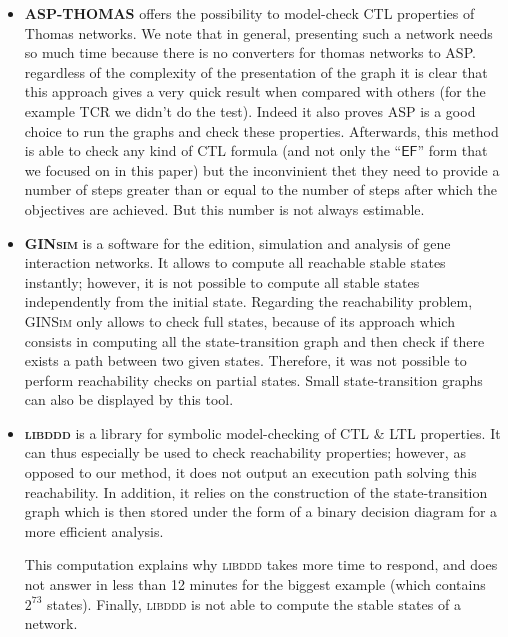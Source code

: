 \begin{itemize}

\item \textbf{ASP-THOMAS} offers the possibility to model-check CTL properties
of Thomas networks.
We note that in general, presenting such a network needs so much time because there is no converters for thomas networks to ASP. regardless of the complexity of the presentation of the graph it is clear that this approach gives a very quick result when compared with others (for the example TCR we didn't do the test). Indeed it also proves ASP is a good choice to run the graphs and check these properties.
Afterwards, this method is able to check any kind of CTL formula
(and not only the “$\mathsf{EF}$” form that we focused on in this paper) but the inconvinient thet they need to provide a number of steps greater than or equal to the number of steps after which the objectives are achieved. But this number is not always estimable.

\item \textbf{\textsc{GINsim}} is a software for the edition, simulation and analysis
of gene interaction networks.
It allows to compute all reachable stable states instantly;
however, it is not possible to compute all stable states independently from the initial state.
Regarding the reachability problem, \textsc{GINSim} only allows to check
full states, because of its approach which consists in computing
all the state-transition graph and then check if there exists a path between two given states.
Therefore, it was not possible to perform reachability checks on partial states.
Small state-transition graphs can also be displayed by this tool.

\item \textbf{\textsc{libddd}}
is a library for symbolic model-checking of CTL \& LTL properties.
It can thus especially be used to check reachability properties;
however, as opposed to our method, it does not output an execution path
solving this reachability.
In addition, it relies on the construction of the state-transition graph
which is then stored under the form of a binary decision diagram for a more efficient analysis.

This computation explains why \textsc{libddd} takes more time to respond,
and does not answer in less than 12 minutes for the biggest example
(which contains $2^{73}$ states).
Finally, \textsc{libddd} is not able to compute the stable states of a network.


\end{itemize}
